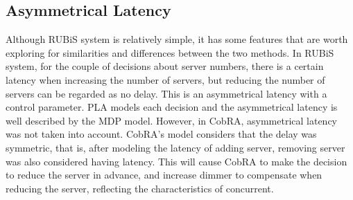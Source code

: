 \documentclass[sigconf]{acmart}
\begin{document}
\subsection{Asymmetrical Latency}
Although RUBiS system is relatively simple, it has some features that are worth exploring for similarities and differences between the two methods.
In RUBiS system, for the couple of decisions about server numbers, there is a certain latency when increasing the number of servers, but reducing the number of servers can be regarded as no delay. This is an asymmetrical latency with a control parameter.
PLA models each decision and the asymmetrical latency is well described by the MDP model.
However, in CobRA, asymmetrical latency was not taken into account. CobRA's model considers that the delay was symmetric, that is, after modeling the latency of adding server, removing server was also considered having latency.
This will cause CobRA to make the decision to reduce the server in advance, and increase dimmer to compensate when reducing the server, reflecting the characteristics of concurrent.
\end{document}
